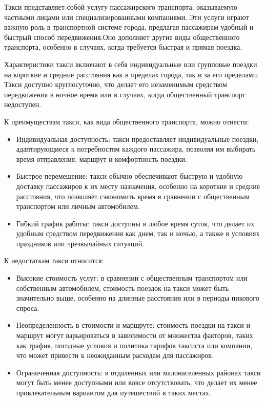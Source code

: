 Такси представляет собой услугу пассажирского транспорта, оказываемую частными лицами или специализированными компаниями. Эти услуги играют важную роль в транспортной системе города, предлагая пассажирам удобный и быстрый способ передвижения.Оно дополняет другие виды общественного транспорта, особенно в случаях, когда требуется быстрая и прямая поездка.

Характеристики такси включают в себя индивидуальные или групповые поездки на короткие и средние расстояния как в пределах города, так и за его пределами. Такси доступно круглосуточно, что делает его незаменимым средством передвижения в ночное время или в случаях, когда общественный транспорт недоступен.

К преимуществам такси, как вида общественного транспорта, можно отнести:
\begin{itemize}
	\item Индивидуальная доступность: такси предоставляет индивидуальные поездки, адаптирующиеся к потребностям каждого пассажира, позволяя им выбирать время отправления, маршрут и комфортность поездки.
	\item Быстрое перемещение: такси обычно обеспечивают быструю и удобную доставку пассажиров к их месту назначения, особенно на короткие и средние расстояния, что позволяет сэкономить время в сравнении с общественным транспортом или личным автомобилем.
	\item Гибкий график работы: такси доступны в любое время суток, что делает их удобным средством передвижения как днем, так и ночью, а также в условиях праздников или чрезвычайных ситуаций.
\end{itemize}

К недостаткам такси относится:
\begin{itemize}
	\item Высокие стоимость услуг: в сравнении с общественным транспортом или собственным автомобилем, стоимость поездок на такси может быть значительно выше, особенно на длинные расстояния или в периоды пикового спроса.
	\item Неопределенность в стоимости и маршруте: стоимость поездки на такси и маршрут могут варьироваться в зависимости от множества факторов, таких как трафик, погодные условия и политика тарифов таксиста или компании, что может привести к неожиданным расходам для пассажиров.
	\item Ограниченная доступность: в отдаленных или малонаселенных районах такси могут быть менее доступными или вовсе отсутствовать, что делает их менее привлекательным вариантом для путешествий в таких местах.
\end{itemize}